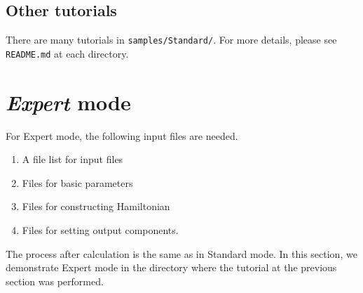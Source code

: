 \subsection{Other tutorials}

There are many tutorials in \verb|samples/Standard/|.
For more details, please see \verb|README.md| at each directory.

\newpage
\section{{\it Expert} mode}
For Expert mode, the following input files are needed.
\begin{enumerate}
\item A file list for input files
\item Files for basic parameters
\item Files for constructing Hamiltonian
\item Files for setting output components.
\end{enumerate}
The process after calculation is the same as in Standard mode.
In this section, we demonstrate Expert mode in the directory where
the tutorial at the previous section was performed.

